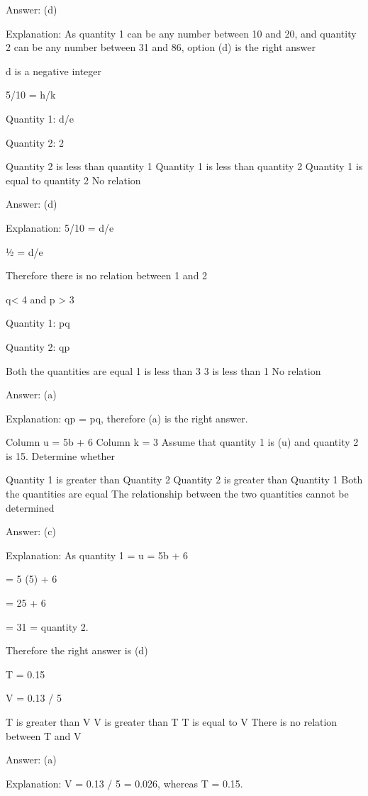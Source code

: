     Answer: (d)

    Explanation: As quantity 1 can be any number between 10 and 20, and quantity 2 can be any number between 31 and 86, option (d) is the right answer

    d is a negative integer

    5/10 = h/k

    Quantity 1: d/e

    Quantity 2: 2

        Quantity 2 is less than quantity 1
        Quantity 1 is less than quantity 2
        Quantity 1 is equal to quantity 2
        No relation

    Answer: (d)

    Explanation: 5/10 = d/e

    ½ = d/e

    Therefore there is no relation between 1 and 2

    q< 4 and p > 3

    Quantity 1: pq

    Quantity 2: qp

        Both the quantities are equal
        1 is less than 3
        3 is less than 1
        No relation

    Answer: (a)

    Explanation: qp = pq, therefore (a) is the right answer.

    Column u = 5b + 6 Column k = 3 Assume that quantity 1 is (u) and quantity 2 is 15. Determine whether

        Quantity 1 is greater than Quantity 2
        Quantity 2 is greater than Quantity 1
        Both the quantities are equal
        The relationship between the two quantities cannot be determined

    Answer: (c)

    Explanation:  As quantity 1 = u = 5b + 6

    = 5 (5) + 6

    = 25 + 6

    = 31 = quantity 2.

    Therefore the right answer is (d)

    T = 0.15

    V = 0.13 / 5

        T is greater than V
        V is greater than T
        T is equal to V
        There is no relation between T and V

    Answer: (a)

    Explanation: V = 0.13 / 5 = 0.026, whereas T = 0.15.

